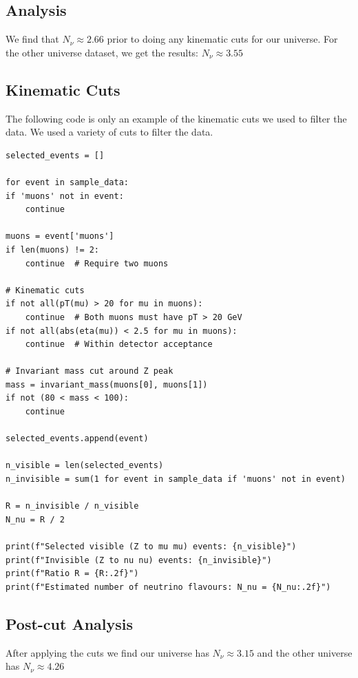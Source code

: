 \subsection{Analysis}

We find that $N_\nu \approx 2.66$ prior to doing any kinematic cuts for our universe.  For the other universe dataset, we get the results: $N_\nu \approx 3.55$



\subsection{Kinematic Cuts}

The following code is only an example of the kinematic cuts we used to filter the data.  We used a variety of cuts to filter the data.
\begin{lstlisting}
selected_events = []

for event in sample_data:
if 'muons' not in event:
    continue

muons = event['muons']
if len(muons) != 2:
    continue  # Require two muons

# Kinematic cuts
if not all(pT(mu) > 20 for mu in muons):
    continue  # Both muons must have pT > 20 GeV
if not all(abs(eta(mu)) < 2.5 for mu in muons):
    continue  # Within detector acceptance

# Invariant mass cut around Z peak
mass = invariant_mass(muons[0], muons[1])
if not (80 < mass < 100):
    continue

selected_events.append(event)

n_visible = len(selected_events)
n_invisible = sum(1 for event in sample_data if 'muons' not in event)

R = n_invisible / n_visible
N_nu = R / 2

print(f"Selected visible (Z to mu mu) events: {n_visible}")
print(f"Invisible (Z to nu nu) events: {n_invisible}")
print(f"Ratio R = {R:.2f}")
print(f"Estimated number of neutrino flavours: N_nu = {N_nu:.2f}")

\end{lstlisting}

\subsection{Post-cut Analysis}

After applying the cuts we find our universe has $N_\nu \approx 3.15$ and the other universe has $N_\nu \approx 4.26$

